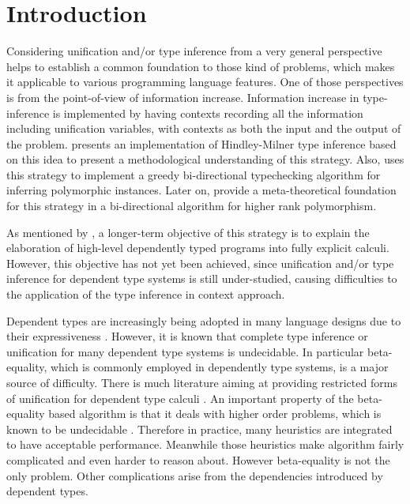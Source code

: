 \section{Introduction}

Considering unification and/or type inference from a very general perspective
helps to establish a common foundation to those kind of problems, which makes it
applicable to various programming language features. One of those
perspectives is from the point-of-view of information 
increase. Information increase in type-inference is implemented by having contexts recording all the
information including unification variables, with contexts as both the input and
the output of the problem. \citet{gundry2010type} presents an implementation of
Hindley-Milner \citep{damas1982principal,hindley69principal} type inference
based on this idea to present a methodological understanding of this strategy.
Also, \citet{dunfield2009greedy} uses this strategy to implement a greedy
bi-directional typechecking algorithm for inferring polymorphic instances. Later
on, \citet{dunfield2013complete} provide a meta-theoretical 
foundation for this strategy in a
bi-directional algorithm for higher rank polymorphism.

As mentioned by \citet{gundry2010type}, a longer-term objective of this strategy
is to explain the elaboration of high-level dependently typed programs into
fully explicit calculi. However, this objective has not yet been
achieved, since unification and/or type inference
for dependent type systems is still under-studied, causing difficulties
to the application of the type inference in context approach.

Dependent types are increasingly being adopted in many language designs due to
their expressiveness \citep{xi1999dependent, licata2005formulation,
  pasalic2006concoqtion, mckinna2006dependent, norell2009dependently,
  brady2013idris}. However, it is known that complete type inference or
unification for many dependent type systems is undecidable. In particular 
beta-equality, which is commonly employed in dependently type systems, is a
major source of difficulty. There is much literature aiming at providing
restricted forms of unification for dependent type calculi
\citep{ziliani2015unification, abel2011higher, elliott1989higher}. An important
property of the beta-equality based algorithm is that it deals with higher order
problems, which is known to be undecidable \citep{goldfarb1981undecidability}.
Therefore in practice, many heuristics are integrated to have acceptable
performance. Meanwhile those heuristics make algorithm fairly complicated
and even harder to reason about. However beta-equality is not the
only problem. Other complications arise from the dependencies introduced by
dependent types.

